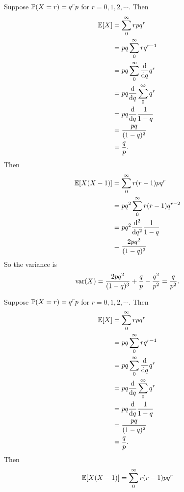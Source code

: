\begin{note}
  \begin{field}
    \begin{eg}
      Suppose $\P(X = r) = q^r p$ for $r= 0, 1, 2, \cdots$. Then
      \begin{align*}
        \E[X] &= \sum_{0}^\infty rpq^r \\
        &= pq\sum_{0}^\infty rq^{r - 1}\\
        &= pq\sum_{0}^\infty \frac{\d }{\d q}q^r\\
        &= pq\frac{\d }{\d q}\sum_{0}^\infty q^r\\
        &= pq\frac{\d }{\d q}\frac{1}{1 - q}\\
        &= \frac{pq}{(1 - q)^2}\\
        &= \frac{q}{p}.
      \end{align*}
      Then
      \begin{align*}
        \E[X(X - 1)] &= \sum_{0}^\infty r(r - 1)pq^r\\
        &= pq^2 \sum_0^\infty r(r - 1)q^{r - 2}\\
        &= pq^2\frac{\d ^2}{\d q^2}\frac{1}{1 - q}\\
        &= \frac{2pq^2}{(1 - q)^3}
      \end{align*}
      So the variance is
      \[
        \var(X) = \frac{2pq^2}{(1 - q)^3}+ \frac{q}{p} - \frac{q^2}{p^2} = \frac{q}{p^2}.
      \]
    \end{eg}
  \end{field}
  \begin{field}
    \begin{eg}
      Suppose $\P(X = r) = q^r p$ for $r= 0, 1, 2, \cdots$. Then
      \begin{align*}
        \E[X] &= \sum_{0}^\infty rpq^r \\
        &= pq\sum_{0}^\infty rq^{r - 1}\\
        &= pq\sum_{0}^\infty \frac{\d }{\d q}q^r\\
        &= pq\frac{\d }{\d q}\sum_{0}^\infty q^r\\
        &= pq\frac{\d }{\d q}\frac{1}{1 - q}\\
        &= \frac{pq}{(1 - q)^2}\\
        &= \frac{q}{p}.
      \end{align*}
      Then
      \begin{align*}
        \E[X(X - 1)] &= \sum_{0}^\infty r(r - 1)pq^r\\

\end{align*}
\end{eg}
\end{field}
\end{note}
